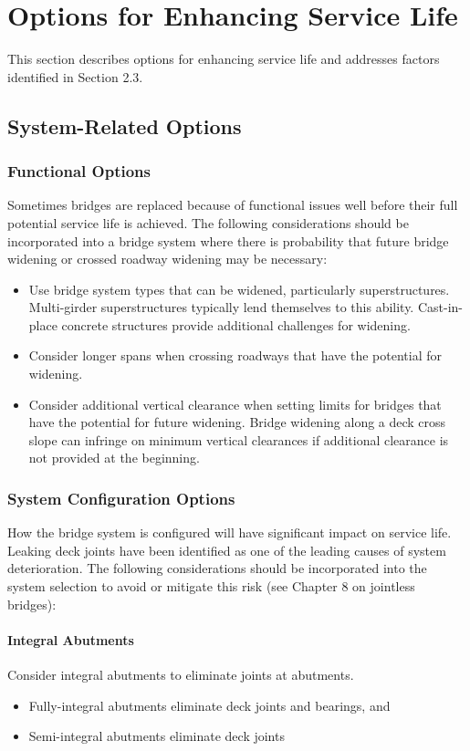 \section{Options for Enhancing Service Life}\label{sec:options-enhance-sl}
This section describes options for enhancing service life and addresses factors identified in Section 2.3.

\subsection{System-Related Options}
\subsubsection{Functional Options}
Sometimes bridges are replaced because of functional issues well before their full potential service life is
achieved. The following considerations should be incorporated into a bridge system where there is probability that
future bridge widening or crossed roadway widening may be necessary:
\begin{itemize}
  \item Use bridge system types that can be widened, particularly superstructures. Multi-girder superstructures
  typically lend themselves to this ability. Cast-in-place concrete structures provide additional challenges for
  widening.
  \item  Consider longer spans when crossing roadways that have the potential for widening.
  \item Consider additional vertical clearance when setting limits for bridges that have the potential for future
  widening. Bridge widening along a deck cross slope can infringe on minimum vertical clearances if
  additional clearance is not provided at the beginning.
\end{itemize}

\subsubsection{System Configuration Options}
How the bridge system is configured will have significant impact on service life. Leaking deck joints have been
identified as one of the leading causes of system deterioration. The following considerations should be incorporated
into the system selection to avoid or mitigate this risk (see Chapter 8 on jointless bridges):
\paragraph{Integral Abutments}
Consider integral abutments to eliminate joints at abutments.
\begin{itemize}
  \item Fully-integral abutments eliminate deck joints and bearings, and
  \item Semi-integral abutments eliminate deck joints
\end{itemize}

